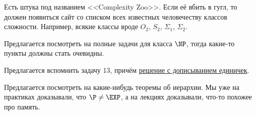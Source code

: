 	Есть штука под названием <<Complexity Zoo>>.
	Если её вбить в гугл, то должен появиться сайт со списком всех известных человечеству классов сложности.
	Например, всякие классы вроде $O_2$, $S_2$, $\Sigma_1$, $\Sigma_2$.

	Предлагается посмотреть на полные задачи для класса $\NP$, тогда какие-то пункты должны стать очевидны.

	Предлагается вспомнить задачу 13, причём \hyperref[prob13_sol2]{решение с дописыванием единичек}.

	Предлагается посмотреть на какие-нибудь теоремы об иерархии.
	Мы уже на практиках доказывали, что $\P \neq \EXP$, а на лекциях доказывали, что-то похожее про память.

